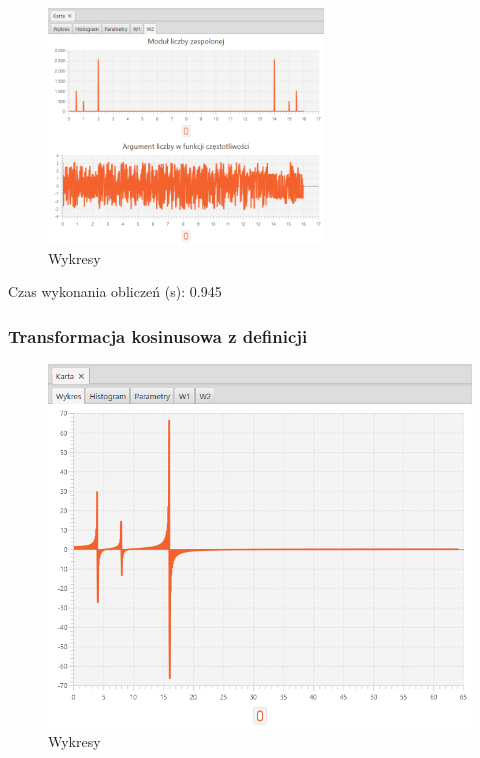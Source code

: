 \documentclass[12pt]{article}
\begin{document}
{{{                \begin{figure}[H]
                    \centering
                    \includegraphics[width=0.65\textwidth]{img/result/s2/03/W2_draw_3_sinus_sampling_trans_s2_data_205752.png}
                    \caption{Wykresy}
                \end{figure}

                Czas wykonania obliczeń (s): 0.945
            }
            \newpage

            \subsubsection{Transformacja kosinusowa z definicji} {

                \begin{figure}[H]
                    \centering
                    \includegraphics[width=\textwidth]{img/result/s2/04/data_draw_4_sinus_sampling_trans_s2_data_205806.png}
                    \caption{Wykresy}
                \end{figure}

}}}
\end{document}
